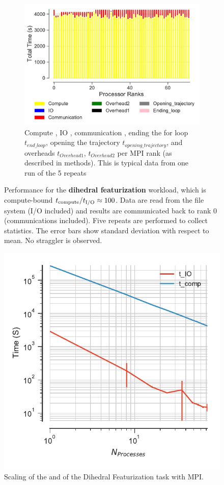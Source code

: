 \begin{figure}
\begin{subfigure} {.8\textwidth}
  \includegraphics[width=\linewidth]{figures/main-dihedral-BarPlot-rank-comparison_72_5.pdf}
  \caption{Compute \tcomp, IO \tIO, communication \tcomm, ending the for loop $t_{end\_loop}$,
  opening the trajectory $t_{opening\_trajectory}$, and overheads $t_{Overhead1}$,  $t_{Overhead2}$ per MPI rank (as described in methods).
  This is typical data from one run of the 5 repeats}
  \label{fig:MPIranks-dihed}
\end{subfigure}
%
\caption{Performance for the \textbf{dihedral featurization} workload,
which is compute-bound ${t}_{\text{compute}}/{t}_{\text{I/O}} \approx 100$. Data are read from the file system (I/O included) 
and results are communicated back to rank 0 (communications included). Five repeats are performed to collect statistics. 
The error bars show standard deviation with respect to mean. No straggler is observed.} 
\label{fig:MPIwithIO-dihed}
\end{figure} 

\begin{figure}
  \centering
  \includegraphics[width=0.4\linewidth]{figures/main-dihed-time_comp_IO_comparison.pdf}
\caption{Scaling of the \tcomp and \tIO of the Dihedral Featurization task with MPI.}
\label{fig:ScalingComputeIO-dihed}
\end{figure}


